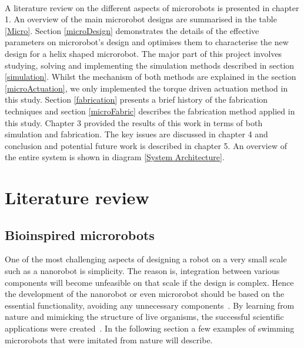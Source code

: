 \documentclass[12pt,a4paper,titlepage]{report}
\begin{document}
\paragraph{}


A literature review on the different aspects of microrobots is presented in chapter 1.
An overview of the main microrobot designs are summarised in the table \ref{Micro}.  
Section \ref{microDesign} demonstrates the details of the effective parameters on 
microrobot\rq{}s design and optimises them to characterise the new design for 
a helix shaped microrobot. The major part of this project involves studying, solving and 
implementing the simulation methods
 described in section \ref{simulation}.  
Whilst the mechanism of both methods are explained in the section \ref{microActuation}, we
only implemented the torque driven actuation method in this study. 
Section \ref{fabrication} presents a brief history of the fabrication techniques and section \ref{microFabric}
 describes the fabrication method applied in this study. Chapter 3 provided the results of this work in terms of both
simulation and fabrication. The key issues are discussed in chapter 4 and conclusion and potential
future work is described in chapter 5. An overview of the entire system is shown in diagram \ref{System Architecture}.
















\section{Literature review}
 


\subsection{Bioinspired microrobots}

One of the most challenging aspects of designing a robot on a very small scale such 
as a nanorobot is simplicity. The reason is, integration between various components
will become unfeasible on that
 scale if the design is complex. Hence the development of the nanorobot or even microrobot
 should be based on the essential functionality, avoiding any unnecessary components~\citep{gao2013bioinspired}.
By learning from nature and mimicking the structure of live organisms, the successful  
scientific applications were created~\citep{qiunanohelices}. In the following section a
 few examples of swimming microrobots that were imitated from nature will describe. 
 
\end{document}
